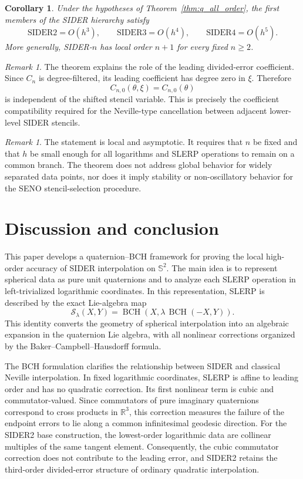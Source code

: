 \documentclass[a4paper,11pt]{article}
\newcommand{\bS}{\mathbb{S}}
\newcommand{\bR}{\mathbb{R}}
\newcommand{\BCH}{\operatorname{BCH}}
\numberwithin{equation}{section}
\theoremstyle{plain}
\newtheorem{corollary}[thm]{Corollary}
\theoremstyle{definition}
\theoremstyle{remark}
\newtheorem{remark}[thm]{Remark}
\begin{document}
\begin{corollary}
Under the hypotheses of Theorem~\ref{thm:q_all_order}, the first members of
the SIDER hierarchy satisfy
\[
        \text{SIDER2}=O(h^3),\qquad
        \text{SIDER3}=O(h^4),\qquad
        \text{SIDER4}=O(h^5).
\]
More generally, SIDER-\(n\) has local order \(n+1\) for every fixed
\(n\geq2\).
\end{corollary}

\begin{remark}
The theorem explains the role of the leading divided-error coefficient.  Since
\(C_n\) is degree-filtered, its leading coefficient has degree zero in
\(\xi\).  Therefore
\[
        C_{n,0}(\theta,\xi)=C_{n,0}(\theta)
\]
is independent of the shifted stencil variable.  This is precisely the
coefficient compatibility required for the Neville-type cancellation between
adjacent lower-level SIDER stencils.
\end{remark}

\begin{remark}
The statement is local and asymptotic.  It requires that \(n\) be fixed and
that \(h\) be small enough for all logarithms and SLERP operations to remain
on a common branch.  The theorem does not address global behavior for widely
separated data points, nor does it imply stability or non-oscillatory behavior
for the SENO stencil-selection procedure.
\end{remark}

\section{Discussion and conclusion}
\label{sec:discussion_conclusion}

This paper develops a quaternion--BCH framework for proving the local
high-order accuracy of SIDER interpolation on \(\bS^2\).  The main idea is to
represent spherical data as pure unit quaternions and to analyze each SLERP
operation in left-trivialized logarithmic coordinates.  In this representation,
SLERP is described by the exact Lie-algebra map
\[
        \mathcal S_\lambda(X,Y)
        =
        \BCH\!\left(X,\lambda\,\BCH(-X,Y)\right).
\]
This identity converts the geometry of spherical interpolation into an
algebraic expansion in the quaternion Lie algebra, with all nonlinear
corrections organized by the Baker--Campbell--Hausdorff formula.

The BCH formulation clarifies the relationship between SIDER and classical
Neville interpolation.  In fixed logarithmic coordinates, SLERP is affine to
leading order and has no quadratic correction.  Its first nonlinear term is
cubic and commutator-valued.  Since commutators of pure imaginary quaternions
correspond to cross products in \(\bR^3\), this correction measures the
failure of the endpoint errors to lie along a common infinitesimal geodesic
direction.  For the SIDER2 base construction, the lowest-order logarithmic
data are collinear multiples of the same tangent element.  Consequently, the
cubic commutator correction does not contribute to the leading error, and
SIDER2 retains the third-order divided-error structure of ordinary quadratic
interpolation.
\end{document}
